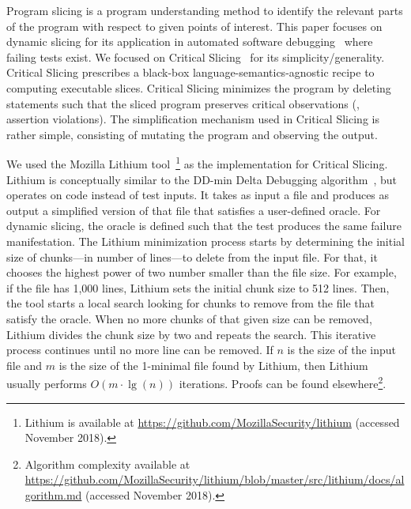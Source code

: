 \documentclass{article}
\begin{document}
Program slicing is a program understanding method to identify the
relevant parts of the program with respect to given points of
interest.  This paper focuses on dynamic slicing
for its application in automated software
debugging~\cite{Binkley:2014:OLP:2635868.2635893} where failing tests
exist. We focused on Critical
Slicing~\cite{DeMillo:1996:CSS:229000.226310} for its
simplicity/generality. Critical Slicing
prescribes a black-box language-semantics-agnostic recipe to computing
executable slices.  Critical Slicing minimizes the program by deleting
statements such that the sliced program preserves critical
observations (\eg{}, assertion violations). The simplification
mechanism used in Critical Slicing is rather simple, consisting of
mutating the program and observing the output.

We used the Mozilla Lithium tool~\footnote{ Lithium is available at \url{https://github.com/MozillaSecurity/lithium} (accessed November 2018).} as the implementation
for Critical Slicing. Lithium is conceptually similar to the DD-min
Delta Debugging algorithm~\cite{zeller-hildebrandt-tse2002}, but
operates on code instead of test inputs. It takes as input a file and
produces as output a simplified version of that file that satisfies a
user-defined oracle. For dynamic slicing, the oracle is defined such
that the test produces the same failure manifestation. The Lithium
minimization process starts by determining the initial size of
chunks---in number of lines---to delete from the input file. For that,
it chooses the highest power of two number smaller than the file
size. For example, if the file has 1,000 lines, Lithium sets the
initial chunk size to 512 lines. Then, the tool starts a local search
looking for chunks to remove from the file that satisfy the
oracle. When no more chunks of that given size can be removed, Lithium
divides the chunk size by two and repeats the search. This iterative
process continues until no more line can be removed.  If $n$ is the
size of the input file and $m$ is the size of the 1-minimal file found
by Lithium, then Lithium usually performs $O(m\cdot\lg(n))$
iterations. Proofs can be found elsewhere\footnote{ Algorithm complexity available at \url{https://github.com/MozillaSecurity/lithium/blob/master/src/lithium/docs/algorithm.md} (accessed November 2018).}.
\end{document}
